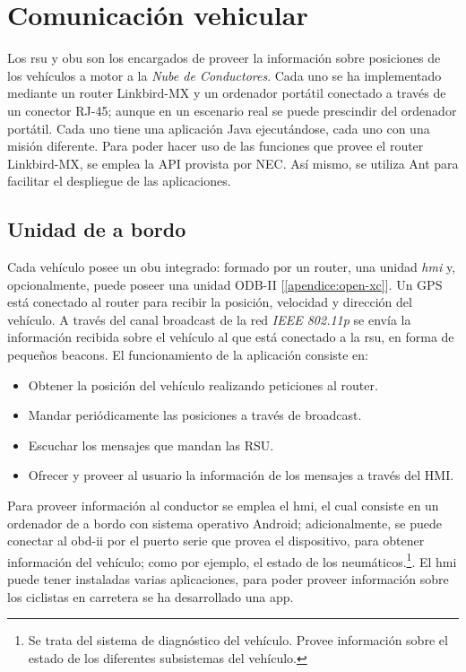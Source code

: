 \section{Comunicación vehicular}\label{section:comunicacion_vehicular}
Los \gls{rsu} y \gls{obu} son los encargados de proveer la información sobre posiciones de los vehículos a motor a la \emph{Nube de Conductores}. Cada uno se ha implementado mediante un router Linkbird-MX y un ordenador portátil conectado a través de un conector RJ-45; aunque en un escenario real se puede prescindir del ordenador portátil. Cada uno tiene una aplicación Java ejecutándose, cada uno con una misión diferente. Para poder hacer uso de las funciones que provee el router Linkbird-MX, se emplea la API provista por NEC. Así mismo, se utiliza Ant para facilitar el despliegue de las aplicaciones.

\subsection{Unidad de a bordo}
Cada vehículo posee un \gls{obu} integrado: formado por un router, una unidad \emph{hmi} y, opcionalmente, puede poseer una unidad ODB-II [\ref{apendice:open-xc}]. Un GPS está conectado al router para recibir la posición, velocidad y dirección del vehículo. A través del canal broadcast de la red \emph{IEEE 802.11p} se envía la información recibida sobre el vehículo al que está conectado a la \gls{rsu}, en forma de pequeños beacons. El funcionamiento de la aplicación consiste en:
\begin{itemize}
	\item Obtener la posición del vehículo realizando peticiones al router.
	\item Mandar periódicamente las posiciones a través de broadcast.
	\item Escuchar los mensajes que mandan las RSU.
	\item Ofrecer y proveer al usuario la información de los mensajes a través del HMI.
\end{itemize}

Para proveer información al conductor se emplea el \gls{hmi}, el cual consiste en un ordenador de a bordo con sistema operativo Android; adicionalmente, se puede conectar al \gls{obd-ii} por el puerto serie que provea el dispositivo, para obtener información del vehículo; como por ejemplo, el estado de los neumáticos.\footnote{Se trata del sistema de diagnóstico del vehículo. Provee información sobre el estado de los diferentes subsistemas del vehículo.}. El \gls{hmi} puede tener instaladas varias aplicaciones, para poder proveer información sobre los ciclistas en carretera se ha desarrollado una app.

